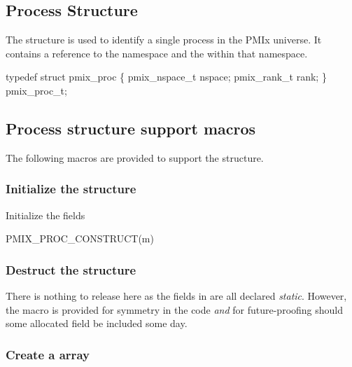 \subsection{Process Structure}

The  structure is used to identify a single process in the PMIx universe.
It contains a reference to the namespace and the  within that namespace.

\cspecificstart
\begin{codepar}
typedef struct pmix_proc \{
    pmix_nspace_t nspace;
    pmix_rank_t rank;
\} pmix_proc_t;
\end{codepar}
\cspecificend

\subsection{Process structure support macros}
The following macros are provided to support the  structure.

\subsubsection{Initialize the  structure}

Initialize the  fields

\cspecificstart
\begin{codepar}
PMIX_PROC_CONSTRUCT(m)
\end{codepar}
\cspecificend

\begin{arglist}
\end{arglist}

\subsubsection{Destruct the  structure}

There is nothing to release here as the fields in  are all declared \emph{static}. However, the macro is provided for symmetry in the code \emph{and} for future-proofing should some allocated field be included some day.

\subsubsection{Create a  array}

